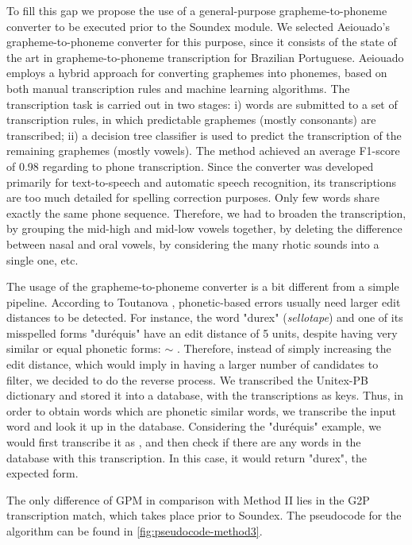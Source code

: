 To fill this gap we propose the use of a general-purpose grapheme-to-phoneme converter to be executed prior to the Soundex module. We selected Aeiouado's grapheme-to-phoneme converter \cite{Mendonca2014} 
for this purpose, since it consists of the state of the art in grapheme-to-phoneme transcription for Brazilian Portuguese. 
Aeiouado employs a hybrid approach for converting graphemes into phonemes, based on both manual transcription rules and machine learning algorithms. The transcription task is carried out in two stages: i) words are submitted to a set of transcription rules, in which predictable graphemes (mostly consonants) are transcribed; ii) a decision tree classifier is used to predict the transcription of the remaining graphemes (mostly vowels). The method achieved an average F1-score of 0.98 regarding to phone transcription. 
Since the converter was developed primarily for text-to-speech and automatic speech recognition, its transcriptions are too much detailed for spelling correction purposes. Only few words share exactly the same phone sequence. Therefore, we had to broaden the transcription, by grouping the mid-high and mid-low vowels together, by deleting the difference between nasal and oral vowels, by considering the many rhotic sounds into a single one, etc.

The usage of the grapheme-to-phoneme converter is a bit different from a simple pipeline. According to Toutanova \cite{Toutanova2002}, phonetic-based errors usually need larger edit distances to be detected. For instance, the word "durex" (\emph{sellotape}) and one of its misspelled forms "dur\'equis" have an edit distance of 5 units, despite having very similar or equal phonetic forms: \textipa{[du'rEks]} $\sim$ \textipa{[du'rEkIs]}. Therefore, instead of simply increasing the edit distance, which would imply in having a larger number of candidates to filter, we decided to do the reverse process. We transcribed the Unitex-PB dictionary and stored it into a database, with the transcriptions as keys. Thus, in order to obtain words which are phonetic similar words, we transcribe the input word and look it up in the database. Considering the "dur\'equis" example, we would first transcribe it as \textipa{[du'rE.kIs]}, and then check if there are any words in the database with this transcription. In this case, it would return "durex", the expected form.

The only difference of GPM in comparison with Method II lies in the G2P transcription match, which takes place prior to Soundex. The pseudocode for the algorithm can be found in \autoref{fig:pseudocode-method3}. 



